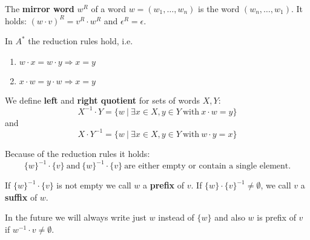 The {\bf mirror word} $w^R$ of a word $w = (w_1,\ldots,w_n)$ is the word
$(w_n,\ldots,w_1)$. It holds: $(w \cdot v)^R = v^R \cdot w^R$ and $\epsilon^R =
\epsilon$.

In $A^*$ the reduction rules hold, i.e.
\begin{enumerate}
  \item $w \cdot x = w \cdot y \Rightarrow x = y$
  \item $x \cdot w = y \cdot w \Rightarrow x = y$
\end{enumerate}

We define {\bf left} and {\bf right quotient} for sets of words $X, Y$:
\[ X^{-1} \cdot Y = \{ w\ |\ \exists x \in X, y \in Y\ \mbox{with}\ x \cdot w =
y \} \] and 
\[ X \cdot Y^{-1} = \{ w\ |\ \exists x \in X, y \in Y\ \mbox{with}\ w \cdot y =
x \} \]

Because of the reduction rules it holds:
\[ \{w\}^{-1} \cdot \{v\}\ \mbox{and}\ \{w\}^{-1} \cdot \{v\}\ \mbox{are
either empty or contain a single element.} \]

If $\{w\}^{-1} \cdot \{v\}$ is not empty we call $w$ a {\bf prefix} of $v$. If
$\{w\} \cdot \{v\}^{-1} \not= \emptyset $, we call $v$ a {\bf suffix} of $w$.

In the future we will always write just $w$ instead of $\{w\}$ and also $w$ is
prefix of $v$ if $w^{-1} \cdot v \not= \emptyset$.

